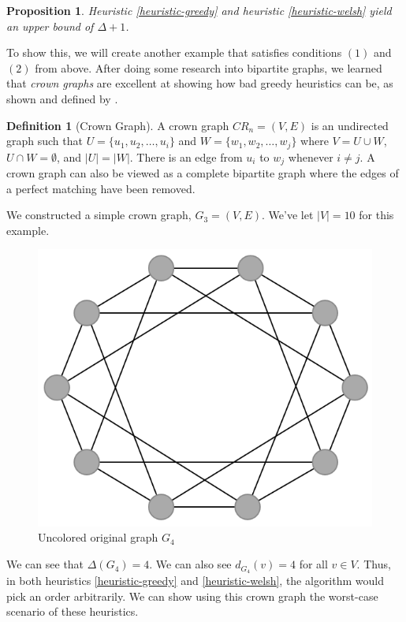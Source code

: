 \documentclass{article}
\newcounter{heuristic} \setcounter{heuristic}{0}
\newtheorem{prop}{Proposition}
\theoremstyle{definition}
\newtheorem{definition}{Definition}
\begin{document}
\begin{prop}
Heuristic \ref{heuristic-greedy} and heuristic \ref{heuristic-welsh} yield an upper bound of \(\Delta + 1\).
\end{prop}

To show this, we will create another example that satisfies conditions \((1)\) and \((2)\) from above. After doing some research into bipartite graphs, we learned that \emph{crown graphs} are excellent at showing how bad greedy heuristics can be, as shown and defined by \citet{kordecki}.

\begin{definition}[Crown Graph]
A crown graph \(CR_n = (V, E)\) is an undirected graph such that \(U = \{u_1, u_2, \dots, u_i\}\) and \(W = \{w_1, w_2, \dots, w_j\}\) where \(V = U \cup W\), \(U \cap W = \emptyset\), and \(|U| = |W|\). There is an edge from \(u_i\) to \(w_j\) whenever \(i \neq j\). A crown graph can also be viewed as a complete bipartite graph where the edges of a perfect matching have been removed.
\end{definition}

We constructed a simple crown graph, \(G_3 = (V, E)\). We've let \(|V| = 10\) for this example.


\begin{figure}[H]
\centering
\includegraphics[scale=0.38]{images/graph-4.png}
\caption{Uncolored original graph \(G_4\)}
\end{figure}

We can see that \(\Delta(G_4) = 4\). We can also see \(d_{G_4}(v) = 4\) for all \(v \in V\). Thus, in both heuristics \ref{heuristic-greedy} and \ref{heuristic-welsh}, the algorithm would pick an order arbitrarily. We can show using this crown graph the worst-case scenario of these heuristics.
\end{document}
